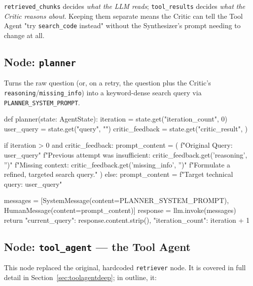 \documentclass[11pt,a4paper]{article}
\begin{document}
\vspace{6pt}
\begin{infobox}
\texttt{retrieved\_chunks} decides \emph{what the LLM reads}; \texttt{tool\_results}
decides \emph{what the Critic reasons about}. Keeping them separate means the
Critic can tell the Tool Agent "try \texttt{search\_code} instead" without the
Synthesizer's prompt needing to change at all.
\end{infobox}

\subsection{Node: \texttt{planner}}
Turns the raw question (or, on a retry, the question plus the Critic's
\texttt{reasoning}/\texttt{missing\_info}) into a keyword-dense search query
via \texttt{PLANNER\_SYSTEM\_PROMPT}.

\begin{pycode}
def planner(state: AgentState):
    iteration = state.get("iteration_count", 0)
    user_query = state.get("query", "")
    critic_feedback = state.get("critic_result", {})

    if iteration > 0 and critic_feedback:
        prompt_content = (
            f"Original Query: {user_query}\n"
            f"Previous attempt was insufficient: {critic_feedback.get('reasoning', '')}\n"
            f"Missing context: {critic_feedback.get('missing_info', '')}\n"
            f"Formulate a refined, targeted search query."
        )
    else:
        prompt_content = f"Target technical query: {user_query}"

    messages = [SystemMessage(content=PLANNER_SYSTEM_PROMPT), HumanMessage(content=prompt_content)]
    response = llm.invoke(messages)
    return {"current_query": response.content.strip(), "iteration_count": iteration + 1}
\end{pycode}

\subsection{Node: \texttt{tool\_agent} --- the Tool Agent}
\label{sec:toolagent}

This node replaced the original, hardcoded \texttt{retriever} node. It is
covered in full detail in Section~\ref{sec:toolagentdeep}; in outline, it:
\end{document}
